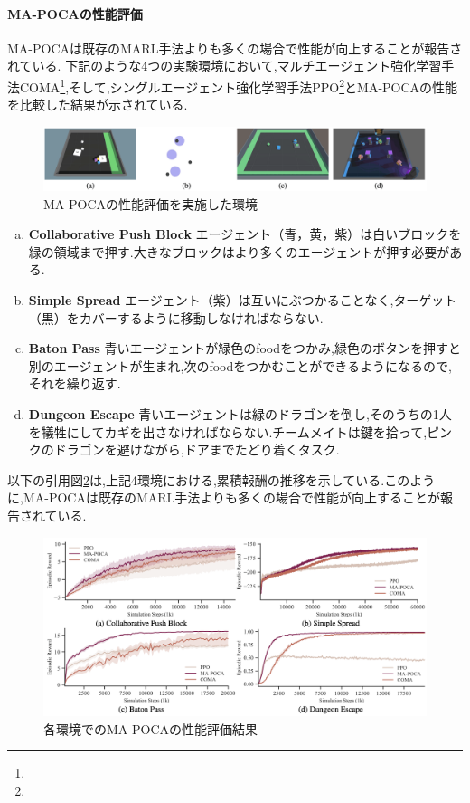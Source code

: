   \paragraph{MA-POCAの性能評価}
  MA-POCAは既存のMARL手法よりも多くの場合で性能が向上することが報告されている\cite{mapoca}.
  下記のような4つの実験環境において,マルチエージェント強化学習手法COMA\footnote{},そして,シングルエージェント強化学習手法PPO\footnote{}とMA-POCAの性能を比較した結果が示されている.
  \begin{figure}[H] 
    \centering 
    \includegraphics[width=1.0\textwidth]{Figures/2022-10-06_10.03.52.png}
    \caption{MA-POCAの性能評価を実施した環境} 
    \label{fig:01} 
  \end{figure}
  \begin{enumerate}[(a)]
    \item \textbf{Collaborative Push Block}
    エージェント（青，黄，紫）は白いブロックを緑の領域まで押す.大きなブロックはより多くのエージェントが押す必要がある.
  
    \item \textbf{Simple Spread}
    エージェント（紫）は互いにぶつかることなく,ターゲット（黒）をカバーするように移動しなければならない.
    
    \item \textbf{Baton Pass}
    青いエージェントが緑色のfoodをつかみ,緑色のボタンを押すと別のエージェントが生まれ,次のfoodをつかむことができるようになるので,それを繰り返す.
    
    \item \textbf{Dungeon Escape}
    青いエージェントは緑のドラゴンを倒し,そのうちの1人を犠牲にしてカギを出さなければならない.チームメイトは鍵を拾って,ピンクのドラゴンを避けながら,ドアまでたどり着くタスク.
\end{enumerate}
以下の引用図\ref{fig:MAPOCA}は,上記4環境における,累積報酬の推移を示している.このように,MA-POCAは既存のMARL手法よりも多くの場合で性能が向上することが報告されている.
\begin{figure}[H] 
  \centering 
  \includegraphics[width=1.0\textwidth]{Figures/2022-10-06_10.04.14-min.png}
  \caption{各環境でのMA-POCAの性能評価結果} 
  \label{fig:MAPOCA} 
\end{figure}

